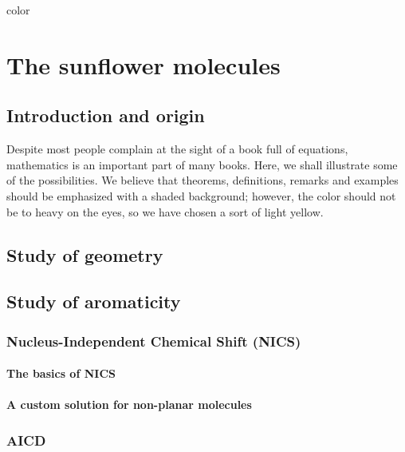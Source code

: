 color
\setchapterpreamble[u]{\margintoc}
\chapter{The sunflower molecules}


\section{Introduction and origin}

\blindtext

Despite most people complain at the sight of a book full of equations,
mathematics is an important part of many books. Here, we shall
illustrate some of the possibilities. We believe that theorems,
definitions, remarks and examples should be emphasized with a shaded
background; however, the color should not be to heavy on the eyes, so
we have chosen a sort of light yellow.


\section{Study of geometry}

\blindtext


\section{Study of aromaticity}

\subsection{Nucleus-Independent Chemical Shift (NICS)}
\blindtext
\subsubsection{The basics of NICS}
\blindtext
\subsubsection{A custom solution for non-planar molecules}
\blindtext

\subsection{AICD}
